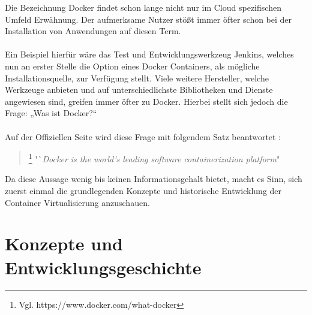 \documentclass[12pt,toc=bib,toc=listof]{scrreprt}
\begin{document}
Die Bezeichnung Docker findet schon lange nicht nur im Cloud spezifischen Umfeld Erwähnung.
Der aufmerksame Nutzer stößt immer öfter schon bei der Installation von Anwendungen auf diesen Term.\\
\\
Ein Beispiel hierfür wäre das Test und Entwicklungswerkzeug Jenkins, welches nun an erster Stelle die Option eines Docker Containers, als mögliche Installationsquelle, zur Verfügung stellt. \cite{jenkins}
Viele weitere Hersteller, welche Werkzeuge anbieten und auf unterschiedlichste Bibliotheken und Dienste angewiesen sind, greifen immer öfter zu Docker. 
Hierbei stellt sich jedoch die Frage: „Was ist Docker?“ \\
\\
Auf der Offiziellen Seite wird diese Frage mit folgendem Satz beantwortet :

\begin{quote}
	\footnote[1]{Vgl. https://www.docker.com/what-docker}
	"`\textit{Docker is the world's leading software containerization platform}"
\end{quote}
Da diese Aussage wenig bis keinen Informationsgehalt bietet, macht es Sinn, sich zuerst einmal die grundlegenden Konzepte und historische Entwicklung der Container Virtualisierung anzuschauen. 

\section{Konzepte und Entwicklungsgeschichte}
\end{document}
